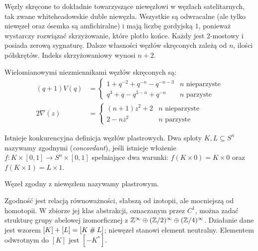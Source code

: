 Węzły skręcone to dokładnie towarzyszące niewęzłowi w węzłach satelitarnych, tak zwane whiteheadowskie duble niewęzła.
Wszystkie są odwracalne (ale tylko niewęzeł oraz ósemka są amfichiralne) i mają liczbę gordyjską $1$, ponieważ wystarczy rozwiązać skrzyżowanie, które plotło końce.
Każdy jest $2$-mostowy i posiada zerową sygnaturę.
Dalsze własności węzłów skręconych zależą od $n$, ilości półskrętów.
Indeks skrzyżowaniowy wynosi $n + 2$.

\begin{proposition}
    Wielomianowymi niezmiennikami węzłów skręconych są:
    \begin{align*}
    (q+1)V(q) & = \begin{cases}
        1+q^{-2}+q^{-n}-q^{-n-3} & n \mbox{ nieparzyste} \\
        q^{3}+q-q^{3-n}+q^{-n} & n \mbox{ parzyste}
    \end{cases} \\
    2 \nabla (z) & = \begin{cases}
        (n+1) z^{2} + 2 & n \mbox{ nieparzyste} \\
        2 - nz^2 & n \mbox{ parzyste}
    \end{cases}
    \end{align*}
\end{proposition}


Istnieje konkurencyjna definicja węzłów plastrowych.
Dwa sploty $K, L \subseteq S^n$ nazywamy zgodnymi (\emph{concordant}), jeśli istnieje włożenie $f \colon K \times [0,1] \to S^n \times [0,1]$ spełniające dwa warunki: $f(K \times 0) = K \times 0$ oraz $f(K \times 1) = L \times 1$.

\begin{definition} \label{def:slice_knot}
    Węzeł zgodny z niewęzłem nazywamy plastrowym.
\end{definition}

Zgodność jest relacją równoważności, słabszą od izotopii, ale mocniejszą od homotopii.
W zbiorze jej klas abstrakcji, oznaczanym przez $C^1$, można zadać strukturę grupy abelowej izomorficznej z $\mathbb Z^\infty \oplus (\mathbb Z/2)^\infty \oplus (\mathbb Z/4)^\infty$.
Działanie dane jest wzorem $[K] + [L] = [K \mathbin{\#} L]$; niewęzeł stanowi element neutralny.
Elementem odwrotnym do $[K]$ jest $[-K^*]$.


